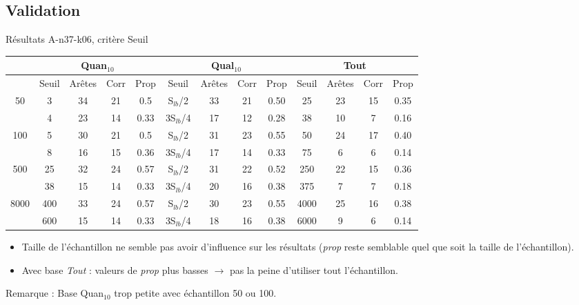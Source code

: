 \documentclass{beamer}
\begin{document}
\subsection{Validation}
\begin{frame}{Résultats A-n37-k06, critère Seuil}

\begin{table}[H]

\begin{tabular}{|@{}c@{}|@{}c@{}|@{}c@{}|@{}c@{}|@{}c@{}||@{}c@{}|@{}c@{}|@{}c@{}|@{}c@{}||@{}c@{}|@{}c@{}|@{}c@{}|@{}c@{}|}

\hline
 & \multicolumn{4}{c|}{Quan$_{10}$} & \multicolumn{4}{c|}{Qual$_{10}$} & \multicolumn{4}{c|}{Tout} \\
 \hline
 & Seuil & Arêtes & Corr & Prop & Seuil & Arêtes & Corr & Prop & Seuil & Arêtes & Corr & Prop \\
 \hline
 50 & 3 & 34 & 21 & 0.5 & S$_{lb}$/2 & 33 & 21 & 0.50 & 25 & 23 & 15 & 0.35 \\
 \cline{2-13} 
    & 4 & 23 & 14 & 0.33 & 3S$_{lb}$/4 & 17 & 12 & 0.28 & 38 & 10 & 7 & 0.16 \\
  \hline
   100 & 5 & 30 & 21 & 0.5 & S$_{lb}$/2 & 31 & 23 & 0.55 & 50 & 24 & 17 & 0.40 \\
 \cline{2-13} 
    & 8 & 16 & 15 & 0.36 & 3S$_{lb}$/4 & 17 & 14 & 0.33 & 75 & 6 & 6 & 0.14 \\
  \hline
   500 & 25 & 32 & 24 & 0.57 & S$_{lb}$/2 & 31 & 22 & 0.52 & 250 & 22 & 15 & 0.36 \\
 \cline{2-13} 
    & 38 & 15 & 14 & 0.33 & 3S$_{lb}$/4 & 20 & 16 & 0.38 & 375 & 7 & 7 & 0.18 \\
  \hline
   8000 & 400 & 33 & 24 & 0.57 & S$_{lb}$/2 & 30 & 23 & 0.55 & 4000 & 25 & 16 & 0.38 \\
 \cline{2-13} 
    & 600 & 15 & 14 & 0.33 & 3S$_{lb}$/4 & 18 & 16 & 0.38 & 6000 & 9 & 6 & 0.14 \\
  \hline

\end{tabular}
\end{table}
\begin{itemize}
\item Taille de l'échantillon ne semble pas avoir d'influence sur les résultats (\emph{prop} reste semblable quel que soit la taille de l'échantillon).
\item Avec base \emph{Tout} : valeurs de \emph{prop} plus basses $\rightarrow$ pas la peine d'utiliser tout l'échantillon.
\end{itemize}

Remarque : Base Quan$_{10}$ trop petite avec échantillon 50 ou 100.


\end{frame}
\end{document}
